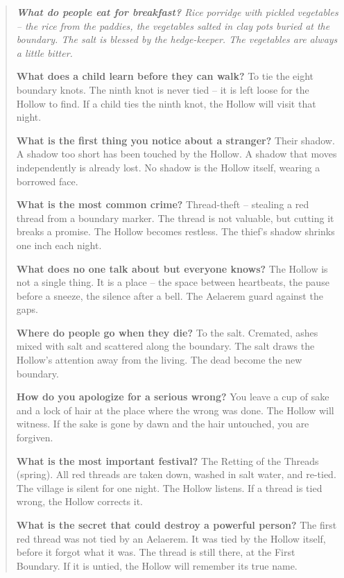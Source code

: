 \documentclass[12pt,oneside]{book}
\newenvironment{almanac}
  {\begin{quote}\small\itshape}
  {\end{quote}}
\begin{document}
\vspace{1em}
\begin{almanac}
\textbf{What do people eat for breakfast?} Rice porridge with pickled vegetables -- the rice from the paddies, the vegetables salted in clay pots buried at the boundary. The salt is blessed by the hedge-keeper. The vegetables are always a little bitter.

\textbf{What does a child learn before they can walk?} To tie the eight boundary knots. The ninth knot is never tied -- it is left loose for the Hollow to find. If a child ties the ninth knot, the Hollow will visit that night.

\textbf{What is the first thing you notice about a stranger?} Their shadow. A shadow too short has been touched by the Hollow. A shadow that moves independently is already lost. No shadow is the Hollow itself, wearing a borrowed face.

\textbf{What is the most common crime?} Thread-theft -- stealing a red thread from a boundary marker. The thread is not valuable, but cutting it breaks a promise. The Hollow becomes restless. The thief's shadow shrinks one inch each night.

\textbf{What does no one talk about but everyone knows?} The Hollow is not a single thing. It is a place -- the space between heartbeats, the pause before a sneeze, the silence after a bell. The Aelaerem guard against the gaps.

\textbf{Where do people go when they die?} To the salt. Cremated, ashes mixed with salt and scattered along the boundary. The salt draws the Hollow's attention away from the living. The dead become the new boundary.

\textbf{How do you apologize for a serious wrong?} You leave a cup of sake and a lock of hair at the place where the wrong was done. The Hollow will witness. If the sake is gone by dawn and the hair untouched, you are forgiven.

\textbf{What is the most important festival?} The Retting of the Threads (spring). All red threads are taken down, washed in salt water, and re-tied. The village is silent for one night. The Hollow listens. If a thread is tied wrong, the Hollow corrects it.

\textbf{What is the secret that could destroy a powerful person?} The first red thread was not tied by an Aelaerem. It was tied by the Hollow itself, before it forgot what it was. The thread is still there, at the First Boundary. If it is untied, the Hollow will remember its true name.
\end{almanac}
\end{document}
